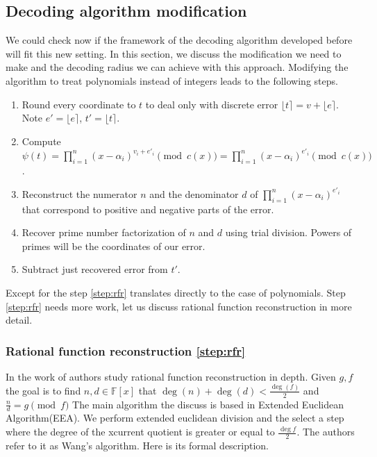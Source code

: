 \documentclass[12pt]{article}
\begin{document}
\subsection{Decoding algorithm modification}
\label{subsec:decoding_polynomials}

We could check now if the framework of the decoding algorithm developed before will fit this new setting. In this section, we discuss the modification we need to make and the decoding radius we can achieve with this approach. Modifying the algorithm to treat polynomials instead of integers leads to the following steps.

\begin{enumerate}
    \item Round every coordinate to $t$ to deal only with discrete error $\lfloor t \rceil = v + \lfloor e \rceil$. Note $e' = \lfloor e \rceil$, $t' = \lfloor t \rceil$.
    \item Compute $\psi(t) = \prod_{i=1}^{n}(x - \alpha_{i})^{v_{i} + e'_i} \pmod{c(x)} = \prod_{i=1}^{n}(x - \alpha_{i})^{e'_i} \pmod{c(x)}$.
    \item \label{step:rfr} Reconstruct the numerator $n$ and the denominator $d$ of $\prod_{i=1}^{n}(x - \alpha_{i})^{e'_i}$ that correspond to positive and negative parts of the error.
    \item Recover prime number factorization of $n$ and $d$ using trial division. Powers of primes will be the coordinates of our error.
    \item Subtract just recovered error from $t'$.
\end{enumerate}

Except for the step \ref{step:rfr} translates directly to the case of polynomials. Step \ref{step:rfr} needs more work, let us discuss rational function reconstruction in more detail.

\subsubsection{Rational function reconstruction \ref{step:rfr}}
\label{subsubsec:rfr}
In the work of \cite{[KM06]} authors study rational function reconstruction in depth.  Given $g,f$ the goal is to find $n, d \in \mathbb{F}[x]$ that $\deg(n) + \deg(d) < \frac{\deg(f)}{2}$ and $\frac{n}{d} = g \pmod{f}$ The main algorithm the discuss is based in Extended Euclidean Algorithm(EEA). We perform extended euclidean division and the select a step where the degree of the xcurrent quotient is greater or equal to $\frac{\deg f}{2}$. The authors refer to it as Wang's algorithm. Here is its formal description.
\end{document}
